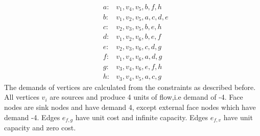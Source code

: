 \begin{align}
  &a:& {v_1, v_4, v_5, b, f, h}\\
  &b:& {v_1, v_2, v_5, a, c, d, e}\\
  &c:& {v_2, v_3, v_5, b, e, h}\\
  &d:& {v_1, v_2, v_6, b, e, f}\\
  &e:& {v_2, v_3, v_6, c, d, g}\\
  &f:& {v_1, v_4, v_6, a, d, g}\\
  &g:& {v_3, v_4, v_6, e, f, h}\\
  &h:& {v_3, v_4, v_5, a, c, g}
\end{align}
The demands of vertices are calculated from the constraints as described before.
All vertices \(v_i\) are sources and produce 4 units of flow,i.e demand of -4. Face nodes are sink nodes and have demand 4, except external face nodes which have demand -4. Edges \(e_{f,g}\) have unit cost and infinite capacity. Edges \(e_{f,v}\) have unit capacity and zero cost.
%
%
%
%   
%
%   
%
%
%
%
%
%
%
%
%
